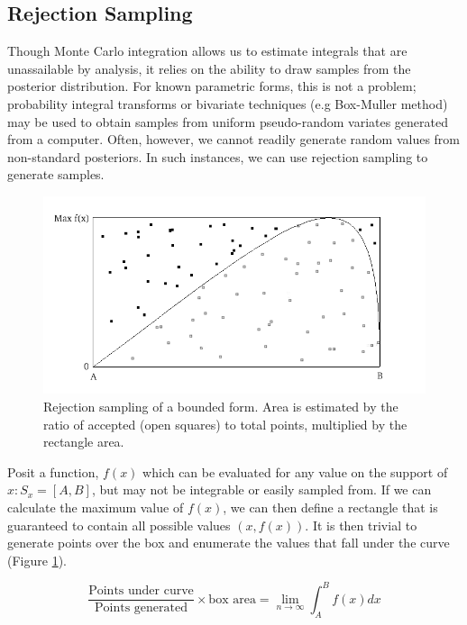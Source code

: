 \documentclass[]{book}
\begin{document}
\subsection{Rejection Sampling}

Though Monte Carlo integration allows us to estimate integrals that are unassailable by analysis, it relies on the ability to draw samples from the posterior distribution. For known parametric forms, this is not a problem; probability integral transforms or bivariate techniques (e.g Box-Muller method) may be used to obtain samples from uniform pseudo-random variates generated from a computer. Often, however, we cannot readily generate random values from non-standard posteriors. In such instances, we can use rejection sampling to generate samples.

\begin{figure}[ht]
        \begin{center}
        \includegraphics[scale=0.4]{reject.png}
    \end{center}
    \caption{Rejection sampling of a bounded form. Area is estimated by the ratio of accepted (open squares) to total points, multiplied by the rectangle area.}
    \label{fig:bound}
\end{figure}

Posit a function, $f(x)$ which can be evaluated for any value on the support of $x:S_x = [A,B]$, but may not be integrable or easily sampled from. If we can calculate the maximum  value of $f(x)$, we can then define a rectangle that is guaranteed to contain all possible values $(x,f(x))$. It is then trivial to generate points over the box and enumerate the values that fall under the curve (Figure \ref{fig:bound}).

\[
\frac{\mbox{Points under curve}}{\mbox{Points generated}} \times \mbox{box area} = \lim_{n \to \infty} \int_A^B f(x) dx
\]
\end{document}
